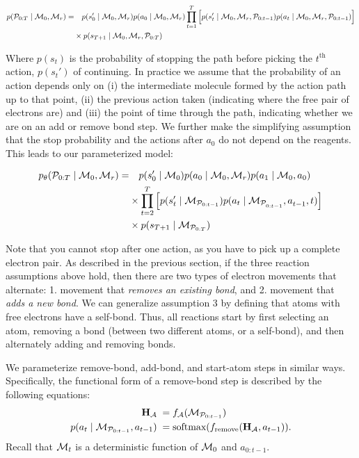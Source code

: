 \begin{align*}
p({\mathcal{P}}_{0:T} \mid {\mathcal{M}}_0, {\mathcal{M}}_r) = &
 \quad 
 p(s_0' \mid {\mathcal{M}}_0, {\mathcal{M}}_r)
 p(a_0 \mid {\mathcal{M}}_0, {\mathcal{M}}_r)
 \prod_{t=1}^{T} \Big[ 
 	p(s_t' \mid {\mathcal{M}}_0, {\mathcal{M}}_r, {\mathcal{P}}_{0:t-1})
 	p(a_t \mid {\mathcal{M}}_0, {\mathcal{M}}_r, {\mathcal{P}}_{0:t-1} ) 
 \Big] \\
 & \times p(s_{T+1} \mid  {\mathcal{M}}_0, {\mathcal{M}}_r, {\mathcal{P}}_{0:T} )
\end{align*}

Where $p(s_{t})$ is the probability of stopping the path before picking the $t^{\text{th}}$ action, $p(s_{t}')$ of continuing.
In practice we assume that the probability of an action depends only on (i) the intermediate molecule formed by the action path up to that point, (ii) the previous action taken (indicating where the free pair of electrons are) and (iii) the point of time through the path, indicating whether we are on an add or remove bond step. 
We further make the simplifying assumption that the stop probability and the actions after $a_0$ do not depend on the reagents. This leads to our parameterized model:

\begin{align*}
p_\theta({\mathcal{P}}_{0:T} \mid {\mathcal{M}}_0, {\mathcal{M}}_r) = &
 \quad p(s_{0}' \mid {\mathcal{M}}_{0})
       p(a_0 \mid {\mathcal{M}}_0, {\mathcal{M}}_r)
       p(a_1 \mid {\mathcal{M}}_0, a_0) \\
       & \times \prod_{t=2}^{T} \Big[
              p(s_{t}' \mid {\mathcal{M}}_{{\mathcal{P}}_{0:t-1}})
              p(a_{t} \mid {\mathcal{M}}_{{\mathcal{P}}_{0:t-1}^{}}, a^{}_{t-1}, t)
       \Big] \\
       & \times p(s_{T+1} \mid {\mathcal{M}}_{{\mathcal{P}}_{0:T}})
\end{align*}

Note that you cannot stop after one action, as you have to pick up a complete electron pair.
As described in the previous section, if the three reaction assumptions above hold, then there are two types of electron movements that alternate: 1. movement that \emph{removes an existing bond}, and 2. movement that \emph{adds a new bond}. We can generalize assumption 3 by defining that atoms with free electrons have a self-bond. Thus, all reactions start by first selecting an atom, removing a bond (between two different atoms, or a self-bond), and then alternately adding and removing bonds. 

We parameterize remove-bond, add-bond, and start-atom steps in similar ways. Specifically, the functional form of a remove-bond step is described by the following equations:
\begin{align}
{\mathbf{H}}_{{\mathcal{A}}} \;&= f_{{\mathcal{A}}}({\mathcal{M}}_{{\mathcal{P}}_{0:t-1}}) \label{eq:rem_atom} \\
p(a_t \mid {\mathcal{M}}_{{\mathcal{P}}_{0:t-1}}, a_{t-1}) \;&= \mbox{softmax}(f_{\textrm{remove}}({\mathbf{H}}_{{\mathcal{A}}}, a_{t-1})). \label{eq:rem_prob}\end{align}
Recall that ${\mathcal{M}}_t$ is a deterministic function of ${\mathcal{M}}_0$ and $a_{0:t-1}$.

